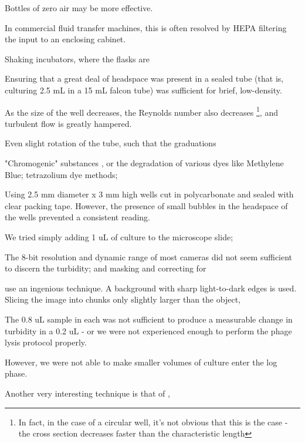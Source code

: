 \documentclass[paper.tex]{subfiles}
\begin{document}
Bottles of zero air may be more effective.

In commercial fluid transfer machines, this is often resolved by HEPA filtering the input to an enclosing cabinet.

Shaking incubators, where the flasks are 

Ensuring that a great deal of headspace was present in a sealed tube (that is, culturing 2.5 mL in a 15 mL falcon tube) was sufficient for brief, low-density.



As the size of the well decreases, the Reynolds number also decreases \footnote{In fact, in the case of a circular well, it's not obvious that this is the case - the cross section decreases faster than the characteristic length}, and turbulent flow is greatly hampered.

Even slight rotation of the tube, such that the graduations 

"Chromogenic" substances \cite{Fluorogenic1991}, or the degradation of various dyes like Methylene Blue; tetrazolium dye methods;

Using 2.5 mm diameter x 3 mm high wells cut in polycarbonate and sealed with clear packing tape. However, the presence of small bubbles in the headspace of the wells prevented a consistent reading.

We tried simply adding 1 uL of culture to the microscope slide;

The 8-bit resolution and dynamic range of most cameras did not seem sufficient to discern the turbidity; and masking and correcting for 

\cite{Vision2016} use an ingenious technique. A background with sharp light-to-dark edges is used. Slicing the image into chunks only slightly larger than the object,


The 0.8 uL sample in each was not sufficient to produce a measurable change in turbidity in a 0.2 uL - or we were not experienced enough to perform the phage lysis protocol properly.

However, we were not able to make smaller volumes of culture enter the log phase.




Another very interesting technique is that of \cite{Study2003}, 
\end{document}
